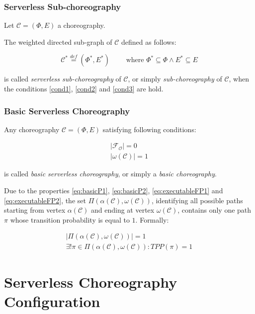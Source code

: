 \documentclass[12pt,a4paper]{report}
\newcommand{\mathDef}{\overset{\textit{def}}{=}}
\begin{document}
\subsubsection{Serverless Sub-choreography}

Let $\mathcal{C} = (\Phi,E)$ a choreography. 

The weighted directed sub-graph of $\mathcal{C}$ defined as follows:

\begin{equation}
	\mathcal{C}^* \mathDef (\Phi^*,E^*) \qquad \text{ where } \Phi^* \subseteq \Phi \wedge E^* \subseteq E
\end{equation}

is called \textit{serverless sub-choreography} of $\mathcal{C}$, or simply \textit{sub-choreography} of $\mathcal{C}$, when the conditions \ref{cond1}, \ref{cond2} and \ref{cond3} are hold.

\subsubsection{Basic Serverless Choreography}\label{BasicDefinition}

Any choreography $\mathcal{C} = (\Phi,E)$ satisfying following conditions:

\begin{eqnarray}
	|\mathscr{F_O}| = 0 \label{eq:basicP1} \\
	|\omega(\mathcal{C})| = 1 \label{eq:basicP2}
\end{eqnarray}

is called \textit{basic serverless choreography}, or simply a \textit{basic choreography}. 

Due to the properties \ref{eq:basicP1}, \ref{eq:basicP2}, \ref{eq:executableFP1} and \ref{eq:executableFP2}, the set $\Pi(\alpha(\mathcal{C}), \omega(\mathcal{C}))$, identifying all possible paths starting from vertex $\alpha(\mathcal{C})$ and ending at vertex $\omega(\mathcal{C})$, contains only one path $\pi$ whose transition probability is equal to $1$. Formally:

\begin{eqnarray}\label{eq:basicP3}
	|\Pi(\alpha(\mathcal{C}), \omega(\mathcal{C}))| = 1 \nonumber \\
	\exists! \pi \in \Pi(\alpha(\mathcal{C}), \omega(\mathcal{C})) : TPP(\pi) = 1
\end{eqnarray}


\section{Serverless Choreography Configuration}
\end{document}
